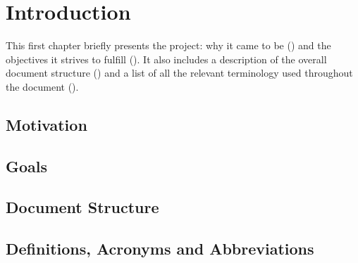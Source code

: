 \chapter{Introduction}
This first chapter briefly presents the project: why it came to be () and the objectives it strives to fulfill (). It also includes a description of the overall document structure () and a list of all the relevant terminology used throughout the document ().


\section{Motivation}\label{sec:motivation}



\section{Goals}\label{sec:goals}


\section{Document Structure}\label{sec:structure}


\section{Definitions, Acronyms and Abbreviations}\label{sec:terminology}
